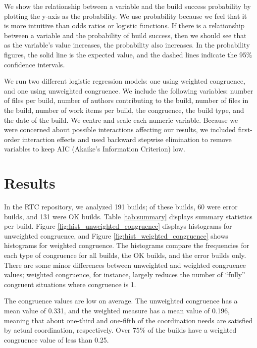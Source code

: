 We show the relationship between a variable and the build success probability by plotting the y-axis as the probability. We use probability because we feel that it is more intuitive than odds ratios or logistic functions. If there is a relationship between a variable and the probability of build success, then we should see that as the variable's value increases, the probability also increases. In the probability figures, the solid line is the expected value, and the dashed lines indicate the 95\% confidence intervals.

We run two different logistic regression models: one using weighted congruence, and one using unweighted congruence. We include the following variables: number of files per build, number of authors contributing to the build, number of files in the build, number of work items per build, the congruence, the build type, and the date of the build. We centre and scale each numeric variable.
Because we were concerned about possible interactions affecting our results, we included first-order interaction effects and used backward stepwise elimination to remove variables to keep AIC (Akaike's Information Criterion) low.

\section{Results}
\label{sec:results}
In the RTC repository, we analyzed 191 builds; of these builds, 60 were error builds, and 131 were OK builds. Table \ref{tab:summary} displays summary statistics per build.
Figure \ref{fig:hist_unweighted_congruence} displays histograms for unweighted congruence, and Figure \ref{fig:hist_weighted_congruence} shows histograms for weighted congruence. The histograms compare the frequencies for each type of congruence for all builds, the OK builds, and the error builds only. There are some minor differences between unweighted and weighted congruence values; weighted congruence, for instance, largely reduces the number of ``fully'' congruent situations where congruence is 1.

The congruence values are low on average. The unweighted congruence has a mean value of 0.331, and the weighted measure has a mean value of 0.196, meaning that about one-third and one-fifth of the coordination needs are satisfied by actual coordination, respectively. Over 75\% of the builds have a weighted congruence value of less than 0.25.

